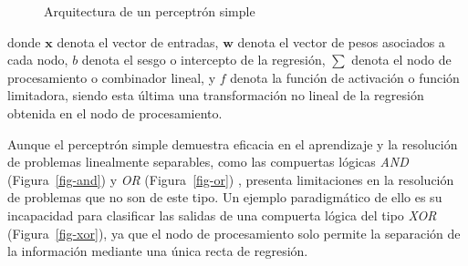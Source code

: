 \documentclass[
  us-letterpaper,
]{scrreprt}
\theoremstyle{definition}
\theoremstyle{plain}
\theoremstyle{plain}
\theoremstyle{definition}
\theoremstyle{remark}
\begin{document}
\begin{figure}


\caption{\label{fig-arqper}Arquitectura de un perceptrón simple}

\end{figure}%

donde \(\mathbf x\) denota el vector de entradas, \(\mathbf w\) denota
el vector de pesos asociados a cada nodo, \(b\) denota el sesgo o
intercepto de la regresión, \(\sum\) denota el nodo de procesamiento o
combinador lineal, y \(f\) denota la función de activación o función
limitadora, siendo esta última una transformación no lineal de la
regresión obtenida en el nodo de procesamiento.

Aunque el perceptrón simple demuestra eficacia en el aprendizaje y la
resolución de problemas linealmente separables, como las compuertas
lógicas \emph{AND} (Figura~\ref{fig-and}) y \emph{OR}
(Figura~\ref{fig-or}) , presenta limitaciones en la resolución de
problemas que no son de este tipo. Un ejemplo paradigmático de ello es
su incapacidad para clasificar las salidas de una compuerta lógica del
tipo \emph{XOR} (Figura~\ref{fig-xor}), ya que el nodo de procesamiento
solo permite la separación de la información mediante una única recta de
regresión.
\end{document}
